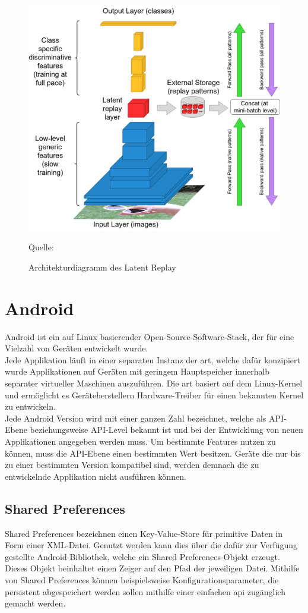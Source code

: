 \documentclass[oneside]{ausarbeitung}
\begin{document}
\begin{figure}[hptb]
  \centering
  \includegraphics[height=0.4\textheight]{images/latent-replay.png}
  \caption{Architekturdiagramm des Latent Replay} Quelle: \cite{Pellegrini2019}
  \label{fig:latent-replay}
\end{figure}
\section{Android}
Android ist ein auf Linux basierender Open-Source-Software-Stack, der für eine Vielzahl von Geräten entwickelt wurde.\\
Jede Applikation läuft in einer separaten Instanz der \ac{art}, welche dafür konzipiert wurde Applikationen auf Geräten mit geringem Hauptspeicher innerhalb separater virtueller Maschinen auszuführen. Die \ac{art} basiert auf dem Linux-Kernel und ermöglicht es Geräteherstellern Hardware-Treiber für einen bekannten Kernel zu entwickeln.\\
Jede Android Version wird mit einer ganzen Zahl bezeichnet, welche als API-Ebene beziehungsweise API-Level bekannt ist und bei der Entwicklung von neuen Applikationen angegeben werden muss. Um bestimmte Features nutzen zu können, muss die API-Ebene einen bestimmten Wert besitzen. Geräte die nur bis zu einer bestimmten Version kompatibel sind, werden demnach die zu entwickelnde Applikation nicht ausführen können.
\cite{android-platform}
\subsection{Shared Preferences}
Shared Preferences bezeichnen einen Key-Value-Store für primitive Daten in Form einer XML-Datei. Genutzt werden kann dies über die dafür zur Verfügung gestellte Android-Bibliothek, welche ein Shared Preferences-Objekt erzeugt. Dieses Objekt beinhaltet einen Zeiger auf den Pfad der jeweiligen Datei. Mithilfe von Shared Preferences können beispielsweise Konfigurationsparameter, die persistent abgespeichert werden sollen mithilfe einer einfachen \ac{api} zugänglich gemacht werden.
\end{document}
